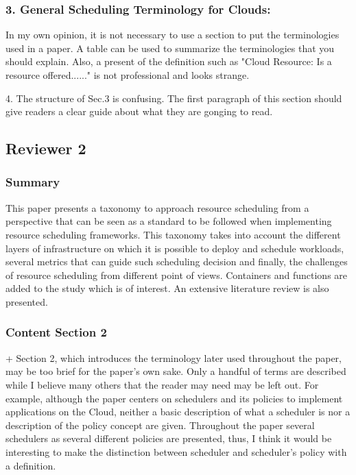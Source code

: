 
\subsubsection{3. General Scheduling Terminology for Clouds:}

In my own opinion, it is
not necessary to use a section to put the terminologies used in a
paper. A table can be used to summarize the terminologies that you
should explain. Also, a present of the definition such as "Cloud
Resource: Is a resource offered......" is not professional and looks
strange.



4. The structure of Sec.3 is confusing. The first paragraph of this
section should give readers a clear guide about what they are gonging
to read.



\subsection{Reviewer 2}

\subsubsection{Summary}

This paper presents a taxonomy to approach resource scheduling from a
perspective that can be seen as a standard to be followed when
implementing resource scheduling frameworks. This taxonomy takes into
account the different layers of infrastructure on which it is possible
to deploy and schedule workloads, several metrics that can guide such
scheduling decision and finally, the challenges of resource scheduling
from different point of views. Containers and functions are added to
the study which is of interest. An extensive literature review is also
presented.



\subsubsection{Content Section 2}

+ Section 2, which introduces the terminology later used throughout
the paper, may be too brief for the paper's own sake. Only a handful
of terms are described while I believe many others that the reader may
need may be left out. For example, although the paper centers on
schedulers and its policies to implement applications on the Cloud,
neither a basic description of what a scheduler is nor a description
of the policy concept are given. Throughout the paper several
schedulers as several different policies are presented, thus, I think
it would be interesting to make the distinction between scheduler and
scheduler's policy with a definition.




